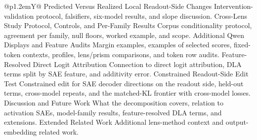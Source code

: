 \begin{tabularx}{\linewidth}{@{}p{1.2em}Y@{}}
  {Predicted Versus Realized Local Readout-Side Changes}
  {Intervention-validation protocol, falsifiers, six-model results, and slope discussion.}
  {Cross-Lens Study Protocol, Controls, and Per-Family Results}
  {Corpus conditionality protocol, agreement per family, null floors, worked example, and scope.}
  {Additional Qwen Displays and Feature Audits}
  {Margin examples, examples of selected scores, fixed-token contexts, profiles, lens/prism comparisons, and token row audits.}
  {Feature-Resolved Direct Logit Attribution}
  {Connection to direct logit attribution, DLA terms split by SAE feature, and additivity error.}
  {Constrained Readout-Side Edit Test}
  {Constrained edit for SAE decoder directions on the readout side, held-out terms, cross-model repeats, and the matched-KL frontier with cross-model losses.}
  {Discussion and Future Work}
  {What the decomposition covers, relation to activation SAEs, model-family results, feature-resolved DLA terms, and extensions.}
  {Extended Related Work}
  {Additional lens-method context and output-embedding related work.}
\bottomrule
\end{tabularx}
\endgroup

